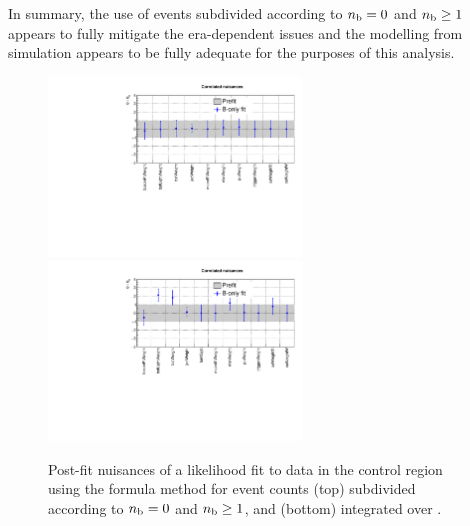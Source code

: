 In summary, the use of \mmj events subdivided according to $n_{\text{b}} = 0$
and $n_{\text{b}} \geq 1$ appears to fully mitigate the era-dependent issues
and the \nb modelling from simulation appears to be fully adequate for
the purposes of this analysis. 

\begin{figure}[h!]
  \centering
  \includegraphics[width=0.6\textwidth]{figures/btag/nuisances/formula/Correlated_nuisances_ge1b}
  \includegraphics[width=0.6\textwidth]{figures/btag/nuisances/formula/Correlated_nuisances_ge0b}
  \caption{\label{fig:btagsfge1b} Post-fit nuisances of a likelihood
    fit to data in the \mmj control region using the formula method
    for \mmj event counts (top) subdivided according to $n_{\text{b}} = 0$ and
    $n_{\text{b}} \geq 1$, and (bottom) integrated over \nb. }
\end{figure}


